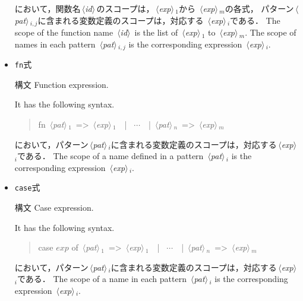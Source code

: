 \documentclass{jbook}
\newcommand{\code}[1]{\mbox{\large\tt #1}}
\newcommand{\nonterm}[1]{\mbox{$\,\langle$}{\it #1}\mbox{$\rangle\,$}}
\newenvironment{program}{\begin{quote}\begin{tt}}%
                        {\end{tt}\end{quote}}
\begin{document}
\begin{itemize}
\ifjp%
において，関数名\nonterm{id}のスコープは，\nonterm{exp}$_1$から
\nonterm{exp}$_m$の各式，
パターン\nonterm{pat}$_{i,j}$に含まれる変数定義のスコープは，対応する
\nonterm{exp}$_i$である．
\else%
	The scope of the function name \nonterm{id} is 
the list of \nonterm{exp}$_1$  to \nonterm{exp}$_m$.
	The scope of names in each pattern \nonterm{pat}$_{i,j}$ is the
corresponding expression \nonterm{exp}$_i$.
\fi%

\item
\ifjp%
 \code{fn}式

構文
\else%
 Function expression.

	It has the following syntax.
\fi%
\begin{program}
fn \nonterm{pat}$_1$\  => \nonterm{exp}$_1$\ \ | \ $\cdots$\ \ | \nonterm{pat}$_n$\  => \nonterm{exp}$_m$
\end{program}
\ifjp%
において，パターン\nonterm{pat}$_{i}$に含まれる変数定義のスコープは，対応する\nonterm{exp}$_i$である．
\else%
	The scope of a name defined in a pattern \nonterm{pat}$_{i}$
is the corresponding expression \nonterm{exp}$_i$.
\fi%

\item
\ifjp%
 \code{case}式

構文
\else%
 Case expression.

	It has the following syntax.
\fi%
\begin{program}
case $exp$ of \nonterm{pat}$_1$\  => \nonterm{exp}$_1$\ \ | \ $\cdots$\ \ | \nonterm{pat}$_n$\  => \nonterm{exp}$_m$
\end{program}
\ifjp%
において，パターン\nonterm{pat}$_{i}$に含まれる変数定義のスコープは，対応する\nonterm{exp}$_i$である．
\else%
	The scope of a name in each pattern \nonterm{pat}$_{i}$ is
the corresponding expression \nonterm{exp}$_i$.
\fi%
\end{itemize}
\end{document}
